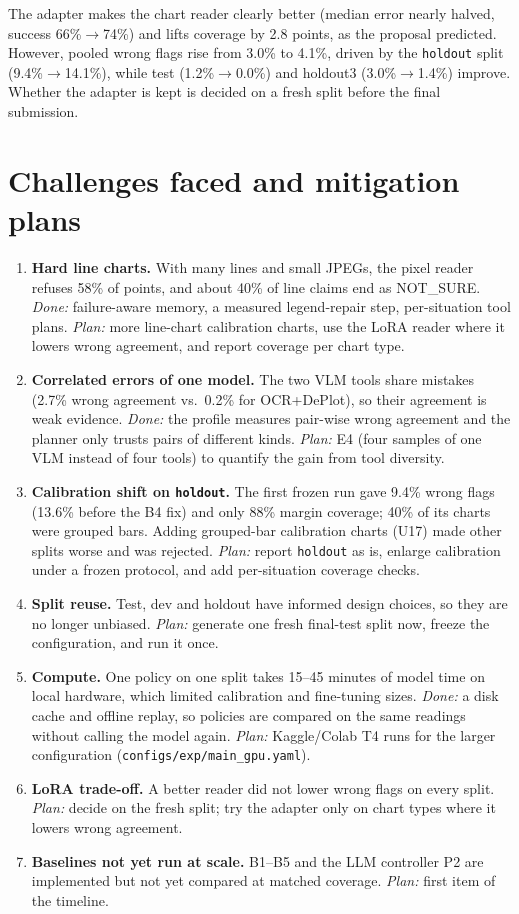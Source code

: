 \documentclass[11pt,a4paper]{article}
\newcommand{\code}[1]{\texttt{\small #1}}
\begin{document}
The adapter makes the chart reader clearly better (median error nearly halved, success 66\%$\to$74\%) and lifts coverage by 2.8 points, as the proposal predicted. However, pooled wrong flags rise from 3.0\% to 4.1\%, driven by the \code{holdout} split (9.4\%$\to$14.1\%), while test (1.2\%$\to$0.0\%) and holdout3 (3.0\%$\to$1.4\%) improve. Whether the adapter is kept is decided on a fresh split before the final submission.

\section{Challenges faced and mitigation plans}
\label{sec:challenges}

\begin{enumerate}
\item \textbf{Hard line charts.} With many lines and small JPEGs, the pixel reader refuses 58\% of points, and about 40\% of line claims end as NOT\_SURE. \emph{Done:} failure-aware memory, a measured legend-repair step, per-situation tool plans. \emph{Plan:} more line-chart calibration charts, use the LoRA reader where it lowers wrong agreement, and report coverage per chart type.
\item \textbf{Correlated errors of one model.} The two VLM tools share mistakes (2.7\% wrong agreement vs.\ 0.2\% for OCR+DePlot), so their agreement is weak evidence. \emph{Done:} the profile measures pair-wise wrong agreement and the planner only trusts pairs of different kinds. \emph{Plan:} E4 (four samples of one VLM instead of four tools) to quantify the gain from tool diversity.
\item \textbf{Calibration shift on \code{holdout}.} The first frozen run gave 9.4\% wrong flags (13.6\% before the B4 fix) and only 88\% margin coverage; 40\% of its charts were grouped bars. Adding grouped-bar calibration charts (U17) made other splits worse and was rejected. \emph{Plan:} report \code{holdout} as is, enlarge calibration under a frozen protocol, and add per-situation coverage checks.
\item \textbf{Split reuse.} Test, dev and holdout have informed design choices, so they are no longer unbiased. \emph{Plan:} generate one fresh final-test split now, freeze the configuration, and run it once.
\item \textbf{Compute.} One policy on one split takes 15--45 minutes of model time on local hardware, which limited calibration and fine-tuning sizes. \emph{Done:} a disk cache and offline replay, so policies are compared on the same readings without calling the model again. \emph{Plan:} Kaggle/Colab T4 runs for the larger configuration (\code{configs/exp/main\_gpu.yaml}).
\item \textbf{LoRA trade-off.} A better reader did not lower wrong flags on every split. \emph{Plan:} decide on the fresh split; try the adapter only on chart types where it lowers wrong agreement.
\item \textbf{Baselines not yet run at scale.} B1--B5 and the LLM controller P2 are implemented but not yet compared at matched coverage. \emph{Plan:} first item of the timeline.
\end{enumerate}
\end{document}
